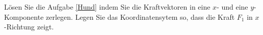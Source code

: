 
\begin{aufgabe}
	Lösen Sie die Aufgabe \ref{Hund} indem Sie die Kraftvektoren in eine $x$- und eine $y$-Komponente zerlegen. Legen Sie das Koordinatensytem so,
	dass die Kraft $F_1$ in $x$-Richtung zeigt.
\end{aufgabe}

